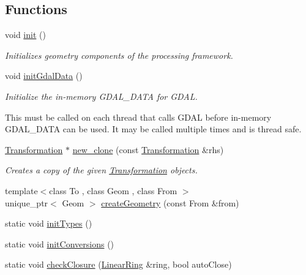 \subsection*{Functions}
\begin{DoxyCompactItemize}
\item 
void \hyperlink{namespacedg_1_1deepcore_1_1geometry_a232d4736f4033977fcd9d75e91c768b3}{init} ()
\begin{DoxyCompactList}\small\item\em Initializes geometry components of the processing framework. \end{DoxyCompactList}\item 
void \hyperlink{group___imagery_module_ga44c5fa041d6209a58a20bc5f4791aecc}{init\+Gdal\+Data} ()
\begin{DoxyCompactList}\small\item\em Initialize the in-\/memory G\+D\+A\+L\+\_\+\+D\+A\+TA for G\+D\+AL.

This must be called on each thread that calls G\+D\+AL before in-\/memory G\+D\+A\+L\+\_\+\+D\+A\+TA can be used. It may be called multiple times and is thread safe. \end{DoxyCompactList}\item 
\hyperlink{structdg_1_1deepcore_1_1geometry_1_1_transformation}{Transformation} $\ast$ \hyperlink{group___imagery_module_ga27ac0f7aa9d16ebbc534d0a07ed2ea09}{new\+\_\+clone} (const \hyperlink{structdg_1_1deepcore_1_1geometry_1_1_transformation}{Transformation} \&rhs)
\begin{DoxyCompactList}\small\item\em Creates a copy of the given \hyperlink{structdg_1_1deepcore_1_1geometry_1_1_transformation}{Transformation} objects. \end{DoxyCompactList}\item 
{\footnotesize template$<$class To , class Geom , class From $>$ }\\unique\+\_\+ptr$<$ Geom $>$ \hyperlink{namespacedg_1_1deepcore_1_1geometry_a3f430e66871663f5ca804c5c291d72f6}{create\+Geometry} (const From \&from)
\item 
static void \hyperlink{namespacedg_1_1deepcore_1_1geometry_a60e33d0276625d48929a46007bfff875}{init\+Types} ()
\item 
static void \hyperlink{namespacedg_1_1deepcore_1_1geometry_ab32c590e56f0cde6e6bd8d957a5b8b1a}{init\+Conversions} ()
\item 
static void \hyperlink{namespacedg_1_1deepcore_1_1geometry_a55e0fea64ebf31b24ac766f5713c37f7}{check\+Closure} (\hyperlink{structdg_1_1deepcore_1_1geometry_1_1_linear_ring}{Linear\+Ring} \&ring, bool auto\+Close)
\end{DoxyCompactItemize}
